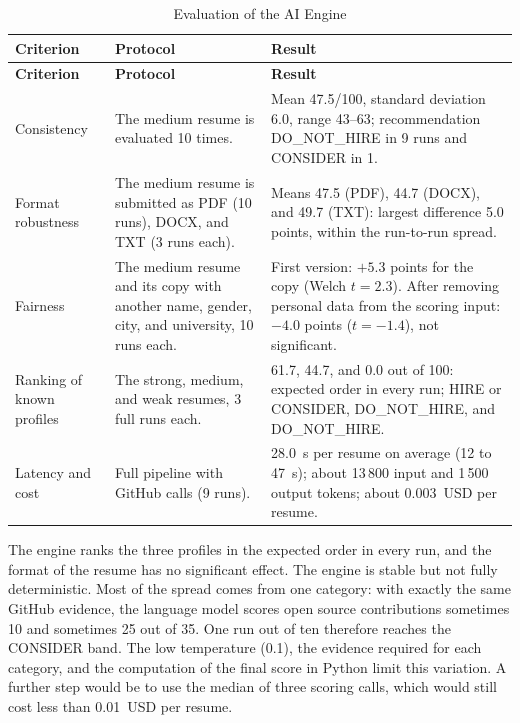 \begingroup
\linespread{1}\selectfont
\renewcommand{\arraystretch}{1.4}
\begin{longtable}{@{}F{3.3cm}F{6.4cm}F{7.8cm}@{}}
\caption{Evaluation of the AI Engine}\label{tab:ai_capability}\\
\toprule
\textbf{Criterion} & \textbf{Protocol} & \textbf{Result} \\
\midrule
\endfirsthead
\toprule
\textbf{Criterion} & \textbf{Protocol} & \textbf{Result} \\
\midrule
\endhead
\bottomrule
\endlastfoot
Consistency & The medium resume is evaluated 10 times. & Mean 47.5/100, standard deviation 6.0, range 43--63; recommendation DO\_NOT\_HIRE in 9 runs and CONSIDER in 1. \\
Format robustness & The medium resume is submitted as PDF (10 runs), DOCX, and TXT (3 runs each). & Means 47.5 (PDF), 44.7 (DOCX), and 49.7 (TXT): largest difference 5.0 points, within the run-to-run spread. \\
Fairness & The medium resume and its copy with another name, gender, city, and university, 10 runs each. & First version: $+5.3$ points for the copy (Welch $t = 2.3$). After removing personal data from the scoring input: $-4.0$ points ($t = -1.4$), not significant. \\
Ranking of known profiles & The strong, medium, and weak resumes, 3 full runs each. & 61.7, 44.7, and 0.0 out of 100: expected order in every run; HIRE or CONSIDER, DO\_NOT\_HIRE, and DO\_NOT\_HIRE. \\
Latency and cost & Full pipeline with GitHub calls (9 runs). & 28.0~s per resume on average (12 to 47~s); about 13\,800 input and 1\,500 output tokens; about 0.003~USD per resume. \\
\end{longtable}
\endgroup

The engine ranks the three profiles in the expected order in every run, and the format of the resume has no significant effect. The engine is stable but not fully deterministic. Most of the spread comes from one category: with exactly the same GitHub evidence, the language model scores open source contributions sometimes 10 and sometimes 25 out of 35. One run out of ten therefore reaches the CONSIDER band. The low temperature (0.1), the evidence required for each category, and the computation of the final score in Python limit this variation. A further step would be to use the median of three scoring calls, which would still cost less than 0.01~USD per resume.

